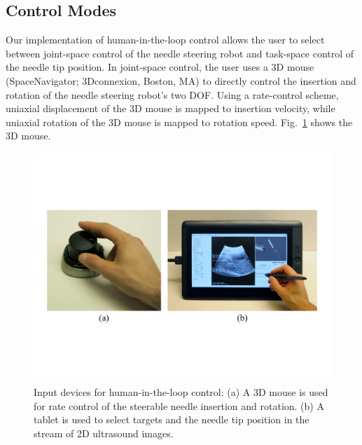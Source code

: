 \subsection{Control Modes}
Our implementation of human-in-the-loop control allows the user to select between joint-space control of the needle steering robot and task-space control of the needle tip position. In joint-space control, the user uses a 3D mouse (SpaceNavigator; 3Dconnexion, Boston, MA) to directly control the insertion and rotation of the needle steering robot's two DOF. Using a rate-control scheme, uniaxial displacement of the 3D mouse is mapped to insertion velocity, while uniaxial rotation of the 3D mouse is mapped to rotation speed. Fig.~\ref{fig:InputDevices} shows the 3D mouse.

\begin{figure}[!t]
\centering
\includegraphics[width = \columnwidth]{./Images/Chapter5/InputDevices/InputDevices.pdf}%
\caption[Input devices for robot control]{Input devices for human-in-the-loop control: (a) A 3D mouse is used for rate control of the steerable needle insertion and rotation. (b) A tablet is used to select targets and the needle tip position in the stream of 2D ultrasound images.}
\label{fig:InputDevices}
\end{figure}  

